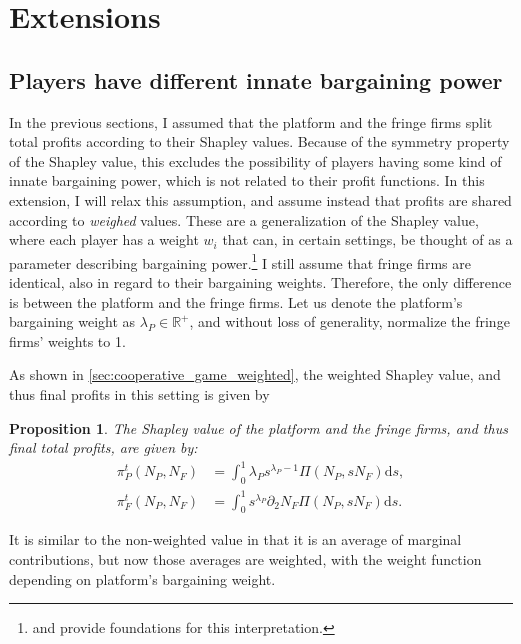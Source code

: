 \documentclass[a4paper]{article}
\newtheorem{proposition}{Proposition}
\newcommand{\ds}{\mathrm{d}s}
\begin{document}
\appendix

\printbibliography


\section{Extensions}
\label{sec:extensions}

\subsection{Players have different innate bargaining power}
\label{sec:higher_bargaining_power}

In the previous sections, I assumed that the platform and the fringe firms split total profits according to their Shapley values.
Because of the symmetry property of the Shapley value, this excludes the possibility of players having some kind of innate bargaining power, which is not related to their profit functions.
In this extension, I will relax this assumption, and assume instead that profits are shared according to \emph{weighed} values.
These are a generalization of the Shapley value, where each player has a weight $w_i$ that can, in certain settings, be thought of as a parameter describing bargaining power.\footnote{
    \textcite{hart1996bargaining} and \textcite{stole1996intra} provide foundations for this interpretation.
}
I still assume that fringe firms are identical, also in regard to their bargaining weights.
Therefore, the only difference is between the platform and the fringe firms.
Let us denote the platform's bargaining weight as $\lambda_P \in \mathbb{R}^+$, and without loss of generality, normalize the fringe firms' weights to 1.

As shown in \cref{sec:cooperative_game_weighted}, the weighted Shapley value, and thus final profits in this setting is given by
\begin{proposition}
    \label{prop:weighted_shapley_value}
    The Shapley value of the platform and the fringe firms, and thus final total profits, are given by:
    \begin{align*}
        \pi^t_P(N_P, N_F) &= \int_0^1 \lambda_P s ^ {\lambda_P - 1} \Pi(N_P,s N_F) \ds, \\
        \pi^t_F(N_P, N_F) &= \int_0^1 s ^ {\lambda_P} \partial_2 N_F \Pi(N_P,s N_F) \ds.
    \end{align*}
\end{proposition}
It is similar to the non-weighted value in that it is an average of marginal contributions, but now those averages are weighted, with the weight function depending on platform's bargaining weight.
\end{document}

